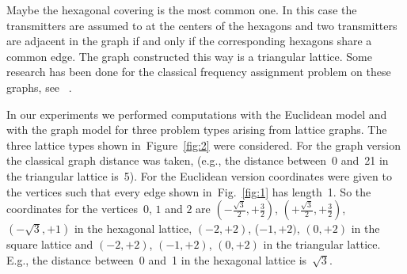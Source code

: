 \documentclass[smallextended]{svjour3}
\begin{document}
 

Maybe the hexagonal covering is the most common one. In this case the transmitters are assumed to at the centers of the hexagons 
and two transmitters are adjacent in the graph 
if and only if the corresponding hexagons share a common 
edge. The graph constructed this way is a triangular lattice. 
Some research has been done for the classical frequency assignment problem on these graphs, see ~\cite{hex1,hex2,hex3,hex4,hex5}.


In our experiments we performed computations with the Euclidean model and with 
the graph model for three problem types arising from lattice graphs. 
The three lattice types shown in~Figure~\ref{fig:2} were considered. 
For the graph version the classical graph distance was taken, 
(e.g., the distance between~0 and~21 in the triangular lattice is~5). 
For the Euclidean version coordinates were given to the vertices such 
that every edge shown in~Fig.~\ref{fig:1} has length~1. 
So the coordinates for the vertices~$0$, $1$ and $2$ are 
$(-\frac{\sqrt{3}}{2},+\frac{3}{2})$, $(+\frac{\sqrt{3}}{2},+\frac{3}{2})$, 
$(-\sqrt{3},+1)$ in the hexagonal lattice, 
$(-2,+2)$, ($-1,+2)$, $(0,+2)$ in the square lattice and 
$(-2,+2)$, $(-1,+2)$, $(0,+2)$ in the triangular lattice. 
E.g., the distance between~0 and~1 in the hexagonal lattice is~$\sqrt{3}$. 
\end{document}
